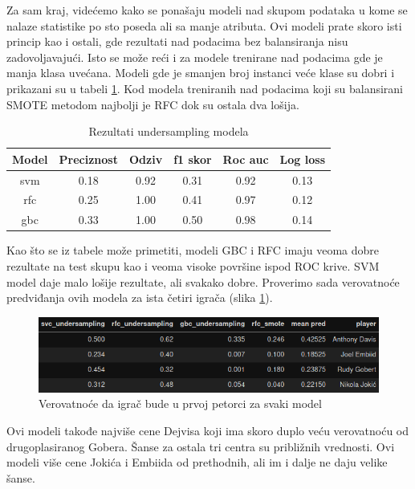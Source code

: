 \documentclass[a4paper]{article}
\begin{document}
Za sam kraj, videćemo kako se ponašaju modeli nad skupom podataka u kome se nalaze statistike po sto poseda ali sa manje atributa. Ovi modeli prate skoro isti princip kao i ostali, gde rezultati nad podacima bez balansiranja nisu zadovoljavajući. Isto se može reći i za modele trenirane nad podacima gde je manja klasa uvećana. Modeli gde je smanjen broj instanci veće klase su dobri i prikazani su u tabeli \ref{tab:undersampling_pp_simple}. Kod modela treniranih nad podacima koji su balansirani SMOTE metodom najbolji je RFC dok su ostala dva lošija.

\begin{table}[!h]
\begin{center}
\begin{tabular}{|c|c|c|c|c|c|} \hline
\textbf{Model} & \textbf{Preciznost} & \textbf{Odziv} & \textbf{f1 skor} & \textbf{Roc auc} & \textbf{Log loss} \\ \hline
svm & 0.18 & 0.92 & 0.31 & 0.92 & 0.13 \\ \hline
rfc & 0.25 & 1.00 & 0.41 & 0.97 & 0.12 \\ \hline
gbc & 0.33 & 1.00 & 0.50 & 0.98 & 0.14 \\ \hline
\end{tabular}
\caption{Rezultati undersampling modela}
\label{tab:undersampling_pp_simple}
\end{center}
\end{table}

Kao što se iz tabele može primetiti, modeli GBC i RFC imaju veoma dobre rezultate na test skupu kao i veoma visoke površine ispod ROC krive. SVM model daje malo lošije rezultate, ali svakako dobre. Proverimo sada verovatnoće predviđanja ovih modela za ista četiri igrača (slika \ref{plt:clf_pp_simpler}).

\begin{figure}[h!]
\begin{center}
\includegraphics[scale=0.50]{clf_pp_simpler.png}
\end{center}
\caption{Verovatnoće da igrač bude u prvoj petorci za svaki model}
\label{plt:clf_pp_simpler}
\end{figure}

Ovi modeli takođe najviše cene Dejvisa koji ima skoro duplo veću verovatnoću od drugoplasiranog Gobera. Šanse za ostala tri centra su približnih vrednosti. Ovi modeli više cene Jokića i Embiida od prethodnih, ali im i dalje ne daju velike šanse.
\end{document}
